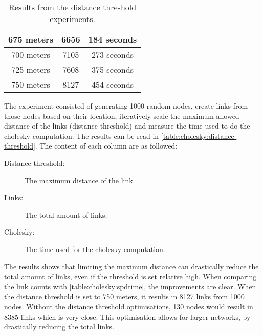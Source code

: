 \begin{table}[H]
\begin{tabular}{|c|c|c|}
        675 meters         & 6656  & 184 seconds      \\\hline
        700 meters         & 7105  & 273 seconds      \\\hline
        725 meters         & 7608  & 375 seconds      \\\hline
        750 meters         & 8127  & 454 seconds      \\\hline
    \end{tabular}
    \caption{Results from the distance threshold experiments.}
    \label{table:cholesky:distance-threshold}
\end{table}

The experiment consisted of generating 1000 random nodes, create links from those nodes based on their location, iteratively scale the maximum allowed distance of the links (distance threshold) and measure the time used to do the cholesky computation. The results can be read in \autoref{table:cholesky:distance-threshold}. The content of each column are as followed:

\begin{description}
    \item[Distance threshold:] The maximum distance of the link.
    \item[Links:] The total amount of links.
    \item[Cholesky:] The time used for the cholesky computation.
\end{description}


The results shows that limiting the maximum distance can drastically reduce the total amount of links, even if the threshold is set relative high. When comparing the link counts with \autoref{table:cholesky:spdtime}, the improvements are clear. When the distance threshold is set to 750 meters, it results in 8127 links from 1000 nodes. Without the distance threshold optimisations, 130 nodes would result in 8385 links which is very close. This optimisation allows for larger networks, by drastically reducing the total links.


